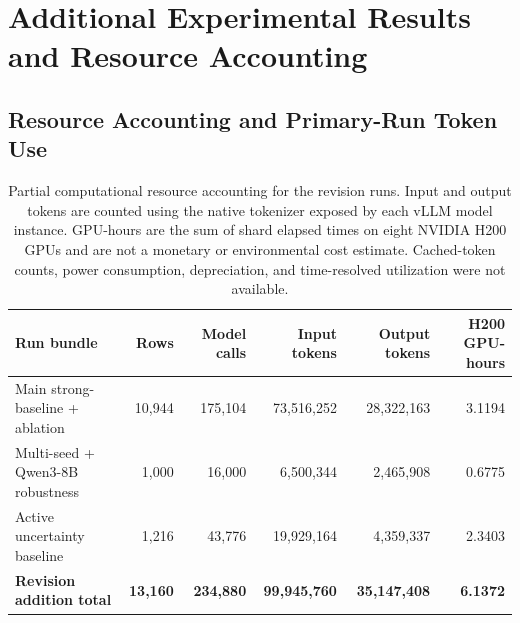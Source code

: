 \documentclass{ieeeaccess}
\begin{document}
\clearpage
\section{Additional Experimental Results and Resource Accounting}
\label{app:additional-result-tables}

\subsection{Resource Accounting and Primary-Run Token Use}
\renewcommand{\thetable}{S6a}
\begin{table}[H]
\centering
\footnotesize
\setlength{\tabcolsep}{3pt}
\caption{Partial computational resource accounting for the revision runs. Input and output
tokens are counted using the native tokenizer exposed by each vLLM model instance. GPU-hours
are the sum of shard elapsed times on eight NVIDIA H200 GPUs and are not a monetary or
environmental cost estimate. Cached-token counts, power consumption, depreciation, and
time-resolved utilization were not available.}
\label{tab:resource-accounting}
\begin{tabular*}{\textwidth}{@{\extracolsep{\fill}}lrrrrr@{}}
\toprule
Run bundle & Rows & Model calls & Input tokens & Output tokens & H200 GPU-hours \\
\midrule
Main strong-baseline + ablation & 10,944 & 175,104 & 73,516,252 & 28,322,163 & 3.1194 \\
Multi-seed + Qwen3-8B robustness & 1,000 & 16,000 & 6,500,344 & 2,465,908 & 0.6775 \\
Active uncertainty baseline & 1,216 & 43,776 & 19,929,164 & 4,359,337 & 2.3403 \\
\textbf{Revision addition total} & \textbf{13,160} & \textbf{234,880} & \textbf{99,945,760} & \textbf{35,147,408} & \textbf{6.1372} \\
\bottomrule
\end{tabular*}
\end{table}
\end{document}
